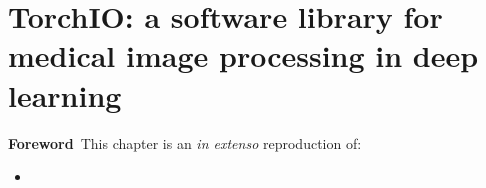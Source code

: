 \chapter[TorchIO: a software library for medical image processing]{TorchIO: a software library for medical image processing in deep learning}

\label{chap:torchio}
\minitoc

\begin{center}
  \begin{minipage}[b]{0.9\linewidth}
    \small
    \textbf{Foreword\,}
    This chapter is an \textit{in extenso} reproduction of:
    \begin{itemize}
      \item {}
    \end{itemize}
  \end{minipage}
\end{center}




